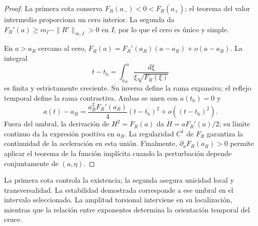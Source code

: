 \begin{proof}
La primera cota conserva
\(F_R(a_-)<0<F_R(a_+)\); el teorema del valor intermedio proporciona
un cero interior. La segunda da
\(F_R'(a)\geq m_I-\|R'\|_{\infty,I}>0\) en \(I\), por lo que el cero
es único y simple.

En \(a>a_R\) cercano al cero,
\(F_R(a)=F_R'(a_R)(a-a_R)+o(a-a_R)\).
La integral
\[
 t-t_{\mathrm b}=\int_{a_R}^{a}
          \frac{d\xi}{\xi\sqrt{F_R(\xi)}}
\]
es finita y estrictamente creciente. Su inversa define la rama
expansiva; el reflejo temporal define la rama contractiva.
Ambas se unen con \(\dot a(t_{\mathrm b})=0\) y
\[
 a(t)-a_R
 =\frac{a_R^2F_R'(a_R)}4(t-t_{\mathrm b})^2
   +o((t-t_{\mathrm b})^2).
\]
Fuera del umbral, la derivación de \(H^2=F_R(a)\) da
\(\dot H=aF_R'(a)/2\); su límite continuo da la expresión positiva
en \(a_R\). La regularidad \(C^1\) de \(F_R\) garantiza la continuidad
de la aceleración en esta unión. Finalmente,
\(\partial_aF_R(a_R)>0\) permite aplicar el teorema de la función
implícita cuando la perturbación depende conjuntamente de \((a,\eta)\).
\end{proof}

La primera cota controla la existencia; la segunda asegura unicidad
local y transversalidad. La estabilidad demostrada corresponde a
ese umbral en el intervalo seleccionado. La amplitud torsional
interviene en su localización, mientras que la relación entre
exponentes determina la orientación temporal del cruce.

\par\endgroup
